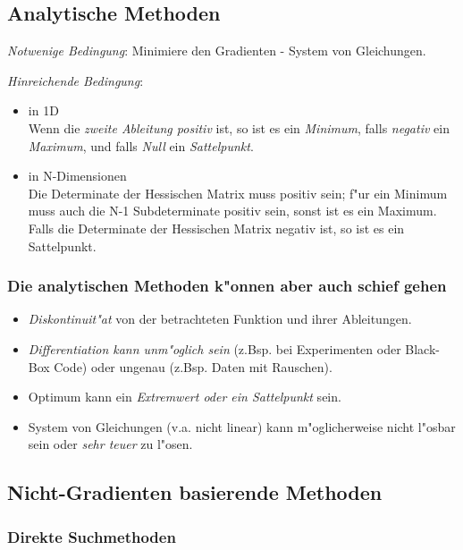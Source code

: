 \documentclass[german, 10pt, a4paper, twocolumn]{scrartcl}
\begin{document}
\subsection{Analytische Methoden}

\textit{Notwenige Bedingung}: Minimiere den Gradienten - System von Gleichungen.

\textit{Hinreichende Bedingung}:
\begin{itemize}
	\item in 1D\\
		Wenn die \textit{zweite Ableitung positiv} ist, so ist es ein \textit{Minimum}, falls \textit{negativ} ein \textit{Maximum}, und falls \textit{Null} ein \textit{Sattelpunkt}.
	\item in N-Dimensionen\\
		Die Determinate der Hessischen Matrix muss positiv sein; f"ur ein Minimum muss auch die N-1 Subdeterminate positiv sein, sonst ist es ein Maximum.\\
		Falls die Determinate der Hessischen Matrix negativ ist, so ist es ein Sattelpunkt.
\end{itemize}

\subsubsection{Die analytischen Methoden k"onnen aber auch schief gehen}

\begin{itemize}
	\item \textit{Diskontinuit"at} von der betrachteten Funktion und ihrer Ableitungen.
	\item \textit{Differentiation kann unm"oglich sein} (z.Bsp. bei Experimenten oder Black-Box Code) oder ungenau (z.Bsp. Daten mit Rauschen).
	\item Optimum kann ein \textit{Extremwert oder ein Sattelpunkt} sein.
	\item System von Gleichungen (v.a. nicht linear) kann m"oglicherweise nicht l"osbar sein oder \textit{sehr teuer} zu l"osen.
\end{itemize}

\subsection{Nicht-Gradienten basierende Methoden}


\subsubsection{Direkte Suchmethoden}
\end{document}
